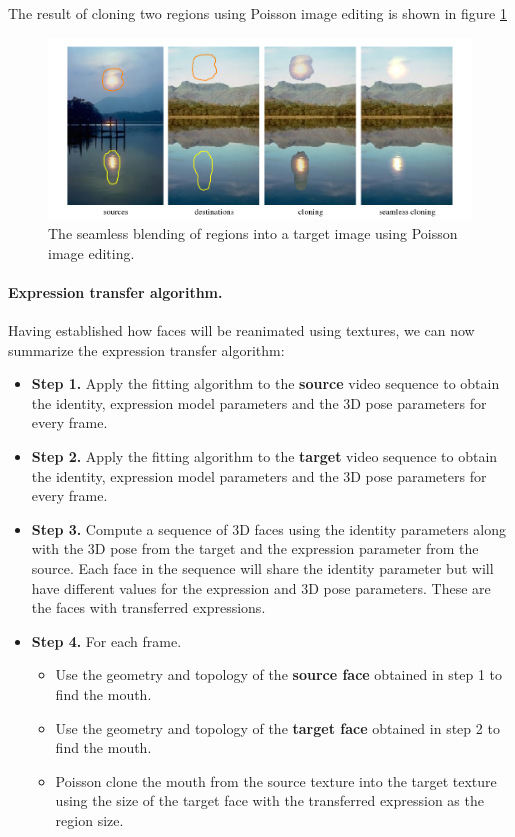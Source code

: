 \documentclass[11pt,a4paper,twoside]{report}
\begin{document}
The result of cloning two regions using Poisson image editing is shown in figure \ref{fg:poisson}
\begin{figure}[H]
\begin{centering}
\includegraphics[scale=0.55]{images/cloning.png}
\par\end{centering}

\caption{The seamless blending of regions into a target image using Poisson
  image editing.}
\label{fg:poisson}

\end{figure}

\paragraph{Expression transfer algorithm.}Having established how faces will be reanimated using textures, we can now
summarize the expression transfer algorithm:
\begin{itemize}
\item \textbf{Step 1.} Apply the fitting algorithm to the \textbf{source} video sequence
  to obtain the identity, expression model parameters and the 3D pose parameters
  for every frame.
\item \textbf{Step 2.} Apply the fitting algorithm to the \textbf{target} video sequence
  to obtain the identity, expression model parameters and the 3D pose
  parameters for every frame.
\item \textbf{Step 3.} Compute a sequence of 3D faces using the identity
  parameters along with the 3D pose from the target and the expression parameter
  from the source. Each face in the sequence will share the identity parameter
  but will have different values for the expression and 3D pose
  parameters. These are the faces with transferred expressions.
\item \textbf{Step 4.} For each frame.
\begin{itemize}
\item[\textbullet] Use the geometry and topology of the \textbf{source face} obtained in step 1 to
  find the mouth.
\item[\textbullet] Use the geometry and topology of the \textbf{target face} obtained in step 2 to
  find the mouth.
\item[\textbullet] Poisson clone the mouth from the source texture into
  the target texture using the size of the target face with the transferred expression as the
  region size.
\end{itemize}
\end{itemize}
\end{document}
